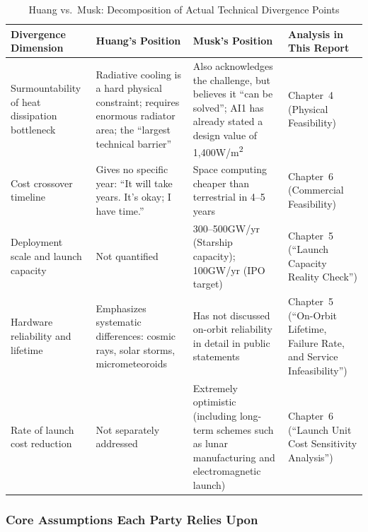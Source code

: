 \begin{table}[H]
\centering
\caption{Huang vs.\ Musk: Decomposition of Actual Technical Divergence Points}
\label{tab:divergence_decomposition}
\small
\begin{tabular}{p{3.0cm}p{3.2cm}p{3.2cm}p{3.0cm}}
\toprule
\textbf{Divergence Dimension} & \textbf{Huang's Position} & \textbf{Musk's Position} & \textbf{Analysis in This Report} \\
\midrule
Surmountability of heat dissipation bottleneck & Radiative cooling is a hard physical constraint; requires enormous radiator area; the ``largest technical barrier'' & Also acknowledges the challenge, but believes it ``can be solved''; AI1 has already stated a design value of 1,400\;W/m\textsuperscript{2} & Chapter~4 (Physical Feasibility) \\
\hline
Cost crossover timeline & Gives no specific year: ``It will take years. It's okay; I have time.'' & Space computing cheaper than terrestrial in 4--5 years & Chapter~6 (Commercial Feasibility) \\
\hline
Deployment scale and launch capacity & Not quantified & 300--500\;GW/yr (Starship capacity); 100\;GW/yr (IPO target) & Chapter~5 (``Launch Capacity Reality Check'') \\
\hline
Hardware reliability and lifetime & Emphasizes systematic differences: cosmic rays, solar storms, micrometeoroids & Has not discussed on-orbit reliability in detail in public statements & Chapter~5 (``On-Orbit Lifetime, Failure Rate, and Service Infeasibility'') \\
\hline
Rate of launch cost reduction & Not separately addressed & Extremely optimistic (including long-term schemes such as lunar manufacturing and electromagnetic launch) & Chapter~6 (``Launch Unit Cost Sensitivity Analysis'') \\
\bottomrule
\end{tabular}
\end{table}

\subsubsection{Core Assumptions Each Party Relies Upon}

